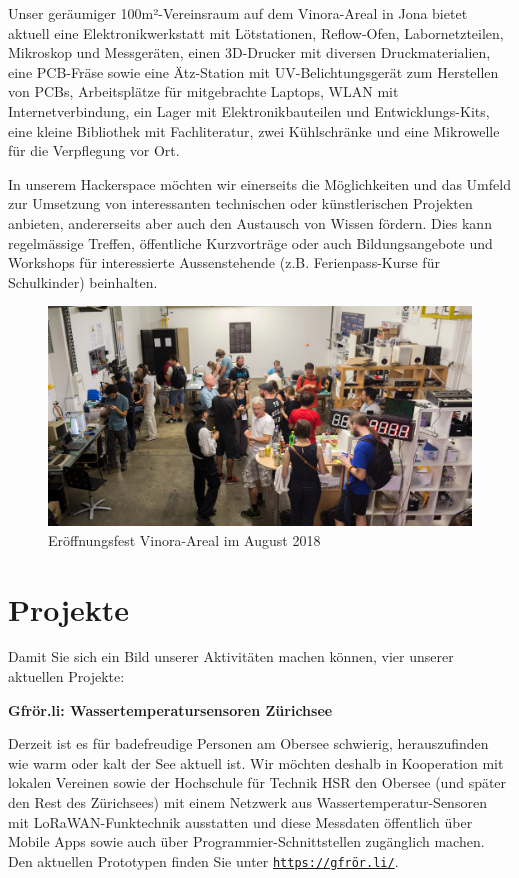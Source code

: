 \documentclass[10pt,a4paper,parskip,fleqn]{scrartcl}
\begin{document}
Unser geräumiger 100m²-Vereinsraum auf dem Vinora-Areal in Jona bietet aktuell
eine Elektronikwerkstatt mit Lötstationen, Reflow-Ofen, Labornetzteilen,
Mikroskop und Messgeräten, einen 3D-Drucker mit diversen Druckmaterialien, eine
PCB-Fräse sowie eine Ätz-Station mit UV-Belichtungsgerät zum Herstellen von
PCBs, Arbeitsplätze für mitgebrachte Laptops, WLAN mit Internetverbindung, ein
Lager mit Elektronikbauteilen und Entwicklungs-Kits, eine kleine Bibliothek mit
Fachliteratur, zwei Kühlschränke und eine Mikrowelle für die Verpflegung vor
Ort.

In unserem Hackerspace möchten wir einerseits die Möglichkeiten und das Umfeld
zur Umsetzung von interessanten technischen oder künstlerischen Projekten
anbieten, andererseits aber auch den Austausch von Wissen fördern. Dies kann
regelmässige Treffen, öffentliche Kurzvorträge oder auch Bildungsangebote und
Workshops für interessierte Aussenstehende (z.B. Ferienpass-Kurse für
Schulkinder) beinhalten.

\begin{figure}[h!]
	\includegraphics[width=\textwidth]{img/eroeffnungsfest.jpg}
	\caption{Eröffnungsfest Vinora-Areal im August 2018}
\end{figure}

\section{Projekte}

Damit Sie sich ein Bild unserer Aktivitäten machen können, vier unserer
aktuellen Projekte:

\textbf{Gfrör.li: Wassertemperatursensoren Zürichsee}

Derzeit ist es für badefreudige Personen am Obersee schwierig, herauszufinden
wie warm oder kalt der See aktuell ist. Wir möchten deshalb in Kooperation mit
lokalen Vereinen sowie der Hochschule für Technik HSR den Obersee (und später
den Rest des Zürichsees) mit einem Netzwerk aus Wassertemperatur-Sensoren mit
LoRaWAN-Funktechnik ausstatten und diese Messdaten öffentlich über Mobile Apps
sowie auch über Programmier-Schnittstellen zugänglich machen. Den aktuellen
Prototypen finden Sie unter
\texttt{\href{https://xn--gfrr-7qa.li/}{https://gfrör.li/}}.
\end{document}
